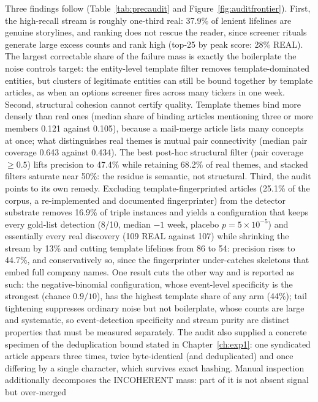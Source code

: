 \documentclass[a4paper,12pt]{report}
\begin{document}
Three findings follow (Table~\ref{tab:precaudit} and
Figure~\ref{fig:auditfrontier}). First, the
high-recall stream is roughly one-third real: 37.9\% of lenient lifelines
are genuine storylines, and ranking does not rescue the reader, since
screener rituals generate large excess counts and rank high (top-25 by peak
score: 28\% REAL). The largest correctable share of the failure mass is
exactly the boilerplate the noise controls target: the entity-level template filter removes
template-dominated entities, but clusters of legitimate entities can
still be bound together by template articles, as when an options
screener fires across many tickers in one week. Second, structural
cohesion cannot certify quality. Template themes bind more densely than
real ones (median share of binding articles mentioning three or more members
0.121 against 0.105), because a mail-merge article lists many concepts at
once; what distinguishes real themes is mutual pair connectivity (median
pair coverage 0.643 against 0.434). The best post-hoc structural filter
(pair coverage $\geq 0.5$) lifts precision to 47.4\% while retaining 68.2\%
of real themes, and stacked filters saturate near 50\%: the residue is
semantic, not structural. Third, the audit points to its own remedy.
Excluding template-fingerprinted articles (25.1\% of the corpus, a
re-implemented and documented fingerprinter) from the detector substrate
removes 16.9\% of triple instances and yields a configuration that keeps
every gold-list detection (8/10, median $-1$ week, placebo
$p = 5\times10^{-5}$) and essentially every real discovery (109 REAL against
107) while shrinking the stream by 13\% and cutting template lifelines from
86 to 54: precision rises to 44.7\%, and conservatively so, since the
fingerprinter under-catches skeletons that embed full company names. One
result cuts the other way and is reported as such: the negative-binomial
configuration, whose event-level specificity is the strongest (chance
$0.9/10$), has the highest template share of any arm (44\%); tail
tightening suppresses ordinary noise but not boilerplate, whose counts are
large and systematic, so event-detection specificity and stream purity are
distinct properties that must be measured separately. The audit also
supplied a concrete specimen of the deduplication bound stated in
Chapter~\ref{ch:exp1}: one syndicated article appears three times, twice
byte-identical (and deduplicated) and once differing by a single character,
which survives exact hashing. Manual inspection additionally decomposes the
INCOHERENT mass: part of it is not absent signal but over-merged
\end{document}
